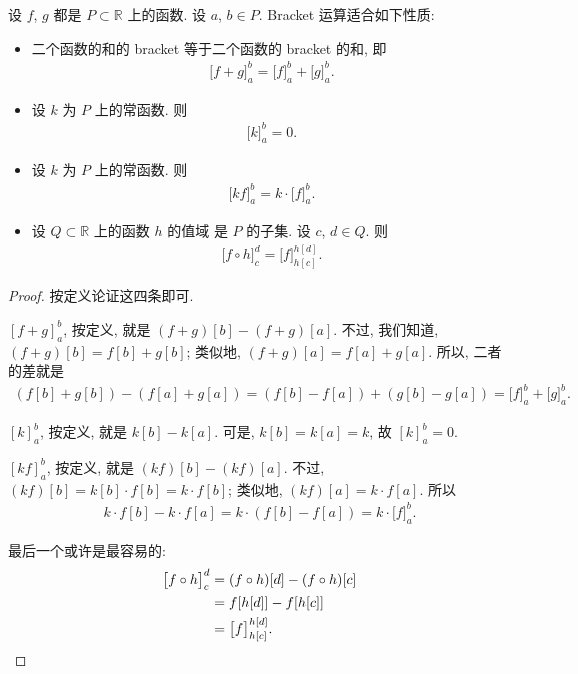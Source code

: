 \begin{theorem}
    设 $f$, $g$ 都是 $P \subset \mathbb{R}$ 上的函数.
    设 $a$, $b \in P$.
    Bracket 运算适合如下性质:
    \begin{itemize}
        \item 二个函数的和的 bracket
              等于二个函数的 bracket 的和, 即
              \begin{align*}
                  \big[ f + g \big]_{a}^{b} = \big[ f \big]_{a}^{b} + \big[ g \big]_{a}^{b}.
              \end{align*}
        \item 设 $k$ 为 $P$ 上的常函数.
              则
              \begin{align*}
                  \big[ k \big]_{a}^{b} = 0.
              \end{align*}
        \item 设 $k$ 为 $P$ 上的常函数.
              则
              \begin{align*}
                  \big[ kf \big]_{a}^{b} = k \cdot \big[ f \big]_{a}^{b}.
              \end{align*}
        \item 设 $Q \subset \mathbb{R}$ 上的函数 $h$ 的值域%
              是 $P$ 的子集.
              设 $c$, $d \in Q$.
              则
              \begin{align*}
                  \big[ f \circ h \big]_{c}^{d} = \big[ f \big]_{h[c]}^{h[d]}.
              \end{align*}
    \end{itemize}
\end{theorem}

\begin{proof}
    按定义论证这四条即可.

    $[ f + g ]_{a}^{b}$, 按定义, 就是 $(f + g)[b] - (f + g)[a]$.
    不过, 我们知道, $(f + g)[b] = f[b] + g[b]$;
    类似地, $(f + g)[a] = f[a] + g[a]$.
    所以, 二者的差就是
    \begin{align*}
        (f[b] + g[b]) - (f[a] + g[a])
        = (f[b] - f[a]) + (g[b] - g[a])
        = \big[ f \big]_{a}^{b} + \big[ g \big]_{a}^{b}.
    \end{align*}

    $[ k ]_{a}^{b}$, 按定义, 就是 $k[b] - k[a]$.
    可是, $k[b] = k[a] = k$, 故 $[ k ]_{a}^{b} = 0$.

    $[ kf ]_{a}^{b}$, 按定义, 就是 $(kf)[b] - (kf)[a]$.
    不过, $(kf)[b] = k[b] \cdot f[b] = k \cdot f[b]$;
    类似地, $(kf)[a] = k \cdot f[a]$.
    所以
    \begin{align*}
        k \cdot f[b] - k \cdot f[a] = k \cdot (f[b] - f[a]) = k \cdot \big[ f \big]_{a}^{b}.
    \end{align*}

    最后一个或许是最容易的:
    \begin{align*}
        \big[ f \circ h \big]_{c}^{d}
        = {} & (f \circ h)[d] - (f \circ h)[c]       \\
        = {} & f[h[d]] - f[h[c]]                     \\
        = {} & \big[ f \big]_{h[c]}^{h[d]}. \qedhere
    \end{align*}
\end{proof}

